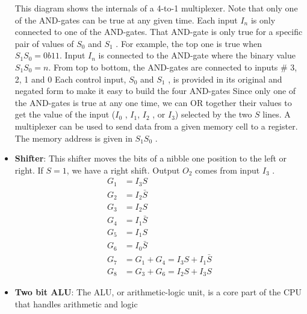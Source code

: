 \documentclass{report}
\begin{document}
\begin{itemize}
            \bigbreak \noindent 
            This diagram shows the internals of a 4-to-1 multiplexer.
            \bigbreak \noindent 
            \bigbreak \noindent 
            Note that only one of the AND-gates can be true at any given time.
            \bigbreak \noindent 
            Each input $I_{n}$ is only connected to one of the AND-gates. That AND-gate is only true for a specific pair of values of $S_{0}$ and $S_{1} $ . For example, the top one is true when $S_{1}S_{0} = 0b11$.
            \bigbreak \noindent 
            Input $I_{n}$ is connected to the AND-gate where the binary value $S_{1}S_{0} = n$. From top to bottom, the AND-gates are connected to inputs \# 3, 2, 1 and 0
            \bigbreak \noindent 
            Each control input, $S_{0}$ and $S_{1}$ , is provided in its original and negated form to make it easy to build the four AND-gates
            \bigbreak \noindent 
            Since only one of the AND-gates is true at any one time, we can OR together their values to get the value of the input ($I_{0} $ , $I_{1} $, $I_{2} $ , or $I_{3}$) selected by the two $S$ lines.
            \bigbreak \noindent 
            A multiplexer can be used to send data from a given memory cell to a register. The memory address is given in $S_{1}S_{0}$ .
        \item \textbf{Shifter}: This shifter moves the bits of a nibble one position to the left or right.
            \bigbreak \noindent 
            If $S = 1$, we have a right shift. Output $O_{2}$ comes from input $I_{3} $ .
            \bigbreak \noindent 
            \bigbreak \noindent 
            \begin{align*}
                G_{1} &= I_{3}S\\
                G_{2} &= I_{2}\bar{S}\\
                G_{3} &= I_{2}S\\
                G_{4} &= I_{1}\bar{S}\\
                G_{5} &= I_{1}S\\
                G_{6} &= I_{0}\bar{S}\\
                G_{7} &= G_{1} + G_{4} = I_{3}S + I_{1}\bar{S} \\
                G_{8} &= G_{3} + G_{6} = I_{2}S + I_{3}S
            \end{align*}
        \item \textbf{Two bit ALU}: The ALU, or arithmetic-logic unit, is a core part of the CPU that handles arithmetic and logic

\end{itemize}
\end{document}
